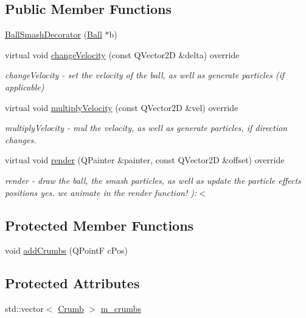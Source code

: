 \subsection*{Public Member Functions}
\begin{DoxyCompactItemize}
\item 
\mbox{\hyperlink{class_ball_smash_decorator_a9820f584d49fa51ccf288b6bb4700744}{Ball\+Smash\+Decorator}} (\mbox{\hyperlink{class_ball}{Ball}} $\ast$b)
\item 
virtual void \mbox{\hyperlink{class_ball_smash_decorator_ad59848156e8eabad3e561a1d113f7029}{change\+Velocity}} (const Q\+Vector2D \&delta) override
\begin{DoxyCompactList}\small\item\em change\+Velocity -\/ set the velocity of the ball, as well as generate particles (if applicable) \end{DoxyCompactList}\item 
virtual void \mbox{\hyperlink{class_ball_smash_decorator_a017998926f2b3ebdfcf49e074ea86aae}{multiply\+Velocity}} (const Q\+Vector2D \&vel) override
\begin{DoxyCompactList}\small\item\em multiply\+Velocity -\/ mul the velocity, as well as generate particles, if direction changes. \end{DoxyCompactList}\item 
virtual void \mbox{\hyperlink{class_ball_smash_decorator_a8cbf47d481100f16f2376670fee9fdcc}{render}} (Q\+Painter \&painter, const Q\+Vector2D \&offset) override
\begin{DoxyCompactList}\small\item\em render -\/ draw the ball, the smash particles, as well as update the particle effects positions yes. we animate in the render function! )\+:$<$ \end{DoxyCompactList}\end{DoxyCompactItemize}
\subsection*{Protected Member Functions}
\begin{DoxyCompactItemize}
\item 
void \mbox{\hyperlink{class_ball_smash_decorator_aa800f137e36d43bdfa86843091905186}{add\+Crumbs}} (Q\+PointF c\+Pos)
\end{DoxyCompactItemize}
\subsection*{Protected Attributes}
\begin{DoxyCompactItemize}
\item 
std\+::vector$<$ \mbox{\hyperlink{struct_ball_smash_decorator_1_1_crumb}{Crumb}} $>$ \mbox{\hyperlink{class_ball_smash_decorator_af9860ac78866ac55c8548b7fd8581610}{m\+\_\+crumbs}}
\end{DoxyCompactItemize}
